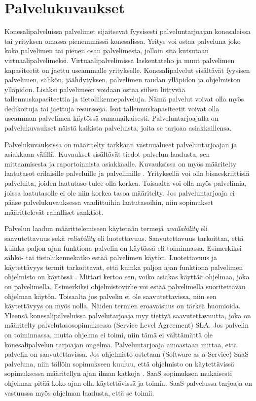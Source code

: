 \section{Palvelukuvaukset}
Konesalipalveluissa palvelimet sijaitsevat fyysisesti palveluntarjoajan konesaleissa tai yrityksen omassa pienemmässä konesalissa. Yritys voi ostaa palveluna joko koko palvelimen tai pienen osan palvelimesta, jolloin sitä kutsutaan virtuaalipalvelimeksi. Virtuaalipalvelimissa laskentateho ja muut palvelimen kapasiteetit on jaettu useammalle yritykselle. Konesalipalvelut sisältävät fyysisen palvelimen, sähkön, jäähdytyksen, palvelimen raudan ylläpidon ja ohjelmiston ylläpidon. Lisäksi palvelimeen voidaan ostaa siihen liittyvää tallennuskapasiteettia ja tietoliikennepalveluja. Nämä palvelut voivat olla myös dedikoituja tai jaettuja resursseja. Isot tallennuskapasiteetit voivat olla useamman palvelimen käytössä samanaikaisesti. Palveluntarjoajalla on palvelukuvaukset näistä kaikista palveluista, joita se tarjoaa asiakkaillensa.\citep{handbook}

Palvelukuvauksissa on määritelty tarkkaan vastuualueet palveluntarjoajan ja asiakkaan välillä. Kuvaukset sisältävät tiedot palvelun laadusta, sen mittaamisesta ja raportoinnista asiakkaalle. Kuvauksissa on myös määritelty laatutasot erilaisille palveluille ja palvelimille \citep{handbook}. Yrityksellä voi olla bisneskriittisiä palveluita, joiden laatutaso tulee olla korkea. Toisaalta voi olla myös palvelimia, joissa laatutasolle ei ole niin korkea tasoa määritelty. Jos palveluntarjoaja ei pääse palvelukuvauksessa vaadittuihin laatutasoihin, niin sopimukset määrittelevät rahalliset sanktiot.

Palvelun laadun määrittelemiseen käytetään termejä \emph{availability} eli saavutettavuus sekä \emph{reliability} eli luotettavuus. Saavutettavuus tarkoittaa, että kuinka paljon ajan funktiona palvelin on käytössä eli toiminnassa. Esimerkiksi sähkö- tai tietoliikennekatko estää palvelimen käytön. Luotettavuus ja käytettävyys termit tarkoittavat, että kuinka paljon ajan funktiona palvelimen ohjelmisto on käytössä \citep{service_availability} \citep{itil}. Mittari kertoo sen, voiko asiakas käyttää ohjelmaa, joka on palvelimella. Esimerkiksi ohjelmistovirhe voi estää palvelimella suoritettavan ohjelman käytön. Toisaalta jos palvelin ei ole saavutettavissa, niin sen käytettävyys on myös nolla. Näiden termien eroavaisuus on tärkeä huomioida. Yleensä konesalipalveluissa palvelutarjoaja myy tiettyä saavutettavuutta, joka on määritelty palvelutasosopimuksessa (Service Level Agreement) SLA. Jos palvelin on toiminnassa, mutta ohjelma ei toimi, niin tämä ei välttämättä ole konesalipalvelun tarjoajan ongelma. Palveluntarjoaja ainoastaan mittaa, että palvelin on saavutettavissa. Jos ohjelmisto ostetaan (Software as a Service) SaaS palveluna, niin tällöin sopimukseen kuuluu, että ohjelmisto on käytettävissä sopimuksessa määritellyn ajan ilman katkoja \citep{software_service}. SaaS sopimuksen mukaisesti ohjelman pitää koko ajan olla käytettävissä ja toimia. SaaS palvelussa tarjoaja on vastuussa myös ohjelman laadusta, että se toimii.


